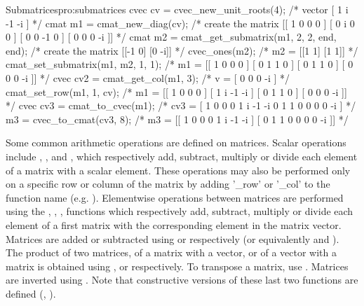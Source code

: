 \begin{program}{Submatrices}{pro:submatrices}
cvec cv = cvec_new_unit_roots(4); /* vector [ 1 i -1 -i ]               */
cmat m1 = cmat_new_diag(cv);      /* create the matrix [[ 1  0  0  0 ]
                                                        [ 0  i  0  0 ]
                                                        [ 0  0 -1  0 ]
                                                        [ 0  0  0 -i ]] */
cmat m2 = cmat_get_submatrix(m1, 2, 2, end, end);
                                  /* create the matrix [[-1 0] [0 -i]]  */
cvec_ones(m2);                    /* m2 = [[1 1] [1 1]]                 */
cmat_set_submatrix(m1, m2, 1, 1); /* m1 = [[ 1  0  0  0 ]
                                           [ 0  1  1  0 ]
                                           [ 0  1  1  0 ]
                                           [ 0  0  0 -i ]]              */
cvec cv2 = cmat_get_col(m1, 3);   /* v = [ 0 0 0 -i ]                   */
cmat_set_row(m1, 1, cv);          /* m1 = [[ 1  0  0  0 ]
                                           [ 1  i -1 -i ]
                                           [ 0  1  1  0 ]
                                           [ 0  0  0 -i ]]              */
cvec cv3 = cmat_to_cvec(m1);
                        /* cv3 = [ 1 0 0 0 1 i -1 -i 0 1 1 0 0 0 0 -i ] */
m3 = cvec_to_cmat(cv3, 8);        /* m3 = [[ 1  0  0  0  1  i -1 -i ]
                                           [ 0  1  1  0  0  0  0 -i ]]  */
\end{program} 

    Some common arithmetic operations are defined on matrices. Scalar
    operations include , ,
     and , which
    respectively add, subtract, multiply or divide each element of a
    matrix with a scalar element. These operations may also be
    performed only on a specific row or column of the matrix by adding
    '\_row' or '\_col' to the function name
    (e.g. ). Elementwise operations between
    matrices are performed using the ,
    , ,
     functions which respectively add,
    subtract, multiply or divide each element of a first matrix with
    the corresponding element in the matrix vector. Matrices are added
    or subtracted using  or 
    respectively (or equivalently  and
    ). The product of two matrices, of a
    matrix with a vector, or of a vector with a matrix is obtained
    using ,  or
     respectively. To transpose a matrix,
    use . Matrices are inverted using
    . Note that constructive versions of these last two
    functions are defined (, ).

